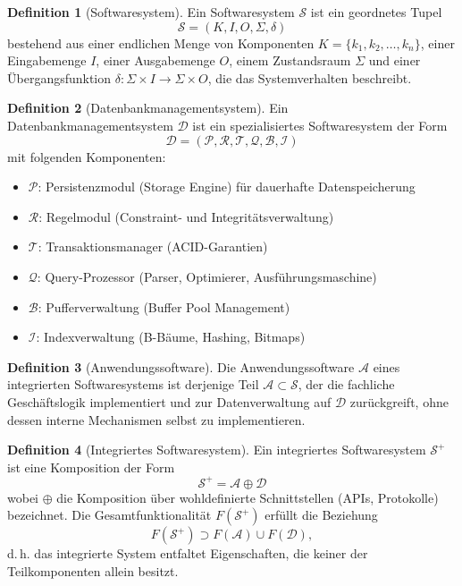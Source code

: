 ﻿\documentclass[a4paper,12pt]{article}
\theoremstyle{definition}
\newtheorem{definition}{Definition}
\begin{document}
\begin{definition}[Softwaresystem]
\label{def:softwaresystem}
Ein Softwaresystem $\mathcal{S}$ ist ein geordnetes Tupel
\[
\mathcal{S} = (K, I, O, \Sigma, \delta)
\]
bestehend aus einer endlichen Menge von Komponenten $K = \{k_1, k_2, \ldots, k_n\}$, einer Eingabemenge $I$, einer Ausgabemenge $O$, einem Zustandsraum $\Sigma$ und einer Übergangsfunktion $\delta: \Sigma \times I \to \Sigma \times O$, die das Systemverhalten beschreibt.
\end{definition}

\begin{definition}[Datenbankmanagementsystem]
\label{def:dbms}
Ein Datenbankmanagementsystem $\mathcal{D}$ ist ein spezialisiertes Softwaresystem der Form
\[
\mathcal{D} = (\mathcal{P}, \mathcal{R}, \mathcal{T}, \mathcal{Q}, \mathcal{B}, \mathcal{I})
\]
mit folgenden Komponenten:
\begin{itemize}
	\item $\mathcal{P}$: Persistenzmodul (Storage Engine) für dauerhafte Datenspeicherung
	\item $\mathcal{R}$: Regelmodul (Constraint- und Integritätsverwaltung)
	\item $\mathcal{T}$: Transaktionsmanager (ACID-Garantien)
	\item $\mathcal{Q}$: Query-Prozessor (Parser, Optimierer, Ausführungsmaschine)
	\item $\mathcal{B}$: Pufferverwaltung (Buffer Pool Management)
	\item $\mathcal{I}$: Indexverwaltung (B-Bäume, Hashing, Bitmaps)
\end{itemize}
\end{definition}

\begin{definition}[Anwendungssoftware]
\label{def:anwendung}
Die Anwendungssoftware $\mathcal{A}$ eines integrierten Softwaresystems ist derjenige Teil $\mathcal{A} \subset \mathcal{S}$, der die fachliche Geschäftslogik implementiert und zur Datenverwaltung auf $\mathcal{D}$ zurückgreift, ohne dessen interne Mechanismen selbst zu implementieren.
\end{definition}

\begin{definition}[Integriertes Softwaresystem]
\label{def:integriert}
Ein integriertes Softwaresystem $\mathcal{S}^+$ ist eine Komposition der Form
\[
\mathcal{S}^+ = \mathcal{A} \oplus \mathcal{D}
\]
wobei $\oplus$ die Komposition über wohldefinierte Schnittstellen (APIs, Protokolle) bezeichnet. Die Gesamtfunktionalität $F(\mathcal{S}^+)$ erfüllt die Beziehung
\[
F(\mathcal{S}^+) \supset F(\mathcal{A}) \cup F(\mathcal{D}),
\]
d.\,h. das integrierte System entfaltet Eigenschaften, die keiner der Teilkomponenten allein besitzt.
\end{definition}
\end{document}
